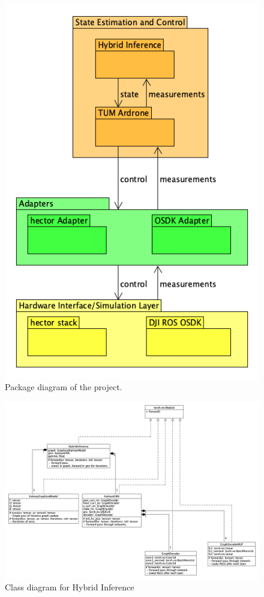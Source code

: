 \documentclass[]{../resources/final_report}
\begin{document}
\begin{figure}[h]
  \centering
  \includegraphics[height=0.30\textheight]{hybrid-inference-package-uml.png}  
  \caption{Package diagram of the project.}
  \label{}
\end{figure}


\begin{figure}[h]
  \centering
  \includegraphics[height=0.36\textheight]{hybrid-inference-uml.png}
  \caption{Class diagram for Hybrid Inference}
  \label{}
\end{figure}
\end{document}

